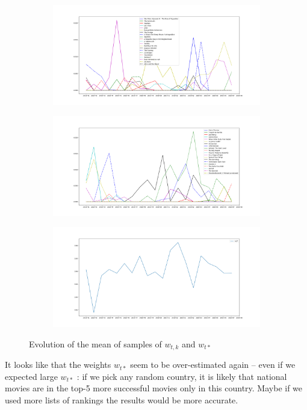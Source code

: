 \documentclass{article}
\begin{document}
\begin{figure}[h!]
\begin{subfigure}[b]{0.6\textwidth}
    \label{fig:resdyn3}
  \end{subfigure}
  \begin{subfigure}[b]{0.6\textwidth}
    \includegraphics[width=\textwidth]{top5_box_office_usukfrde_results10000itev3_part4.png}
    \label{fig:resdyn4}
  \end{subfigure}
  \begin{subfigure}[b]{0.6\textwidth}
    \includegraphics[width=\textwidth]{top5_box_office_usukfrde_results10000itev3_part5.png}
    \label{fig:resdyn5}
  \end{subfigure}
  \begin{subfigure}[b]{0.6\textwidth}
    \includegraphics[width=\textwidth]{top5_box_office_usukfrde_results10000itev3_part6.png}
    \label{fig:resdyn6}
  \end{subfigure}
\caption{Evolution of the mean of samples of $w_{t,k}$ and $w_{t*}$}
\end{figure}

It looks like that the weights $w_{t*}$ seem to be over-estimated again -- even if we expected large $w_{t*}$ : if we pick any random country, it is likely that national movies are in the top-5 more successful movies only in this country. Maybe if we used more lists of rankings the results would be more accurate.





\end{document}
